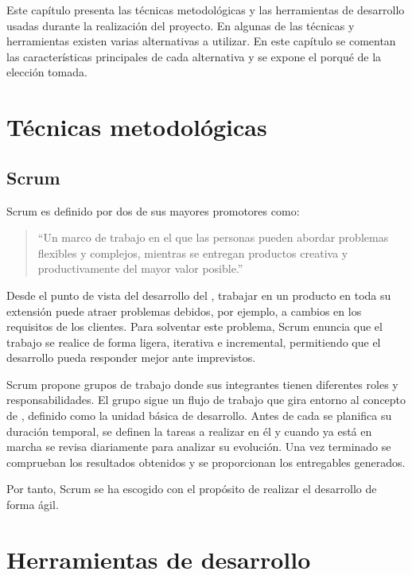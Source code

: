 Este capítulo presenta las técnicas metodológicas y las herramientas de
desarrollo usadas durante la realización del proyecto. En algunas de las
técnicas y herramientas existen varias alternativas a utilizar. En este capítulo
se comentan las características principales de cada alternativa y se expone el
porqué de la elección tomada.

\section{Técnicas metodológicas}{\label{sec:tecnicas}}

\subsection{Scrum}{\label{sec:scrum}}
Scrum es definido por dos de sus mayores promotores \textcite{schwaber2017}
como:
\begin{quotation}``Un marco de trabajo en el que las personas pueden
  abordar problemas flexibles y complejos, mientras se entregan productos creativa y
  productivamente del mayor valor posible.''
\end{quotation}

Desde el punto de vista del desarrollo del , trabajar en
un producto en toda su extensión puede atraer problemas debidos, por ejemplo, a
cambios en los requisitos de los clientes. Para solventar este problema, Scrum
enuncia que el trabajo se realice de forma ligera, iterativa e incremental,
permitiendo que el desarrollo pueda responder mejor ante imprevistos.

Scrum propone grupos de trabajo donde sus integrantes tienen diferentes roles y
responsabilidades. El grupo sigue un flujo de trabajo que gira entorno al
concepto de , definido como la unidad básica de
desarrollo. Antes de cada  se planifica su duración
temporal, se definen la tareas a realizar en él y cuando ya está en marcha se
revisa diariamente para analizar su evolución. Una vez terminado se comprueban
los resultados obtenidos y se proporcionan los entregables generados.

Por tanto, Scrum se ha escogido con el propósito de realizar el desarrollo de
forma ágil.

\section{Herramientas  de desarrollo}
  {\label{sec:herramientas}}

